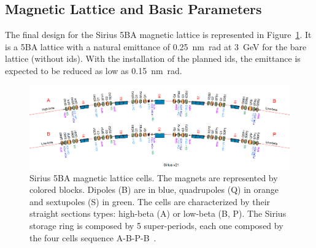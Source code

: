 \subsection{Magnetic Lattice and Basic Parameters}
The final design for the Sirius 5BA magnetic lattice is represented in Figure~\ref{fig:sirius_lattice}. It is a 5BA lattice with a natural emittance of \SI{0.25}{\nano\meter\radian} at \SI{3}{\giga\electronvolt} for the bare lattice (without \glspl{id}). With the installation of the planned \glspl{id}, the emittance is expected to be reduced as low as \SI{0.15}{\nano\meter\radian}.
\begin{figure}
    \centering
    \includegraphics[scale=0.27, trim={0 2cm 0 0}, clip]{figures/sirius_lattice.png}
    \caption{Sirius 5BA magnetic lattice cells. The magnets are represented by colored blocks. Dipoles (B) are in blue, quadrupoles (Q) in orange and sextupoles (S) in green. The cells are characterized by their straight sections types: high-beta (A) or low-beta (B, P). The Sirius storage ring is composed by 5 super-periods, each one composed by the four cells sequence A-B-P-B~\cite{wiki}.}
    \label{fig:sirius_lattice}
\end{figure}

